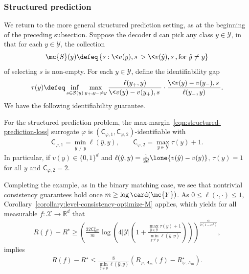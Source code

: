 \documentclass[11pt]{article}
\newcommand{\prn}[1]{\left({#1}\right)} %
\newcommand{\constant}{\mathsf{C}}  %
\newcommand{\cstMT}{\constant_{\mathsf{MT}}}
\newcommand{\pred}{\mathsf{d}}  %
\newcommand{\sX}{\mathcal{X}} %
\newcommand{\sY}{\mathcal{Y}} %
\newcommand{\tloss}{\ell}  %
\newcommand{\sloss}{\varphi}  %
\begin{document}
\subsubsection{Structured prediction}

We return to the more general structured prediction setting, as
at the beginning of the preceding subsection.
%
Suppose the
decoder $\pred$ can pick any class $y \in \sY$, in that for
each $y \in \sY$, the collection
\begin{align*}
  \mc{S}(y) \defeq
  \left\{s: \< v(y), s\> > \< v(\hat y), s \>, \mbox{for~} \hat{y} \neq y\right\}
\end{align*}
of selecting $s$
is non-empty.
%
For each $y \in \sY$, define the identifiability gap
\begin{align*}
  \tau(y) \defeq \inf_{s \in \mathcal{S}(y)}
  \max_{y_+, y_- \neq y}
  \frac{\tloss(y_+,y)}{\<v(y) - v(y_+), s\>}
  \cdot \frac{\<v(y) - v(y_-), s\>}{
    \tloss(y_-, y)}.
\end{align*}
We have the following identifiability guarantee.
\begin{lemma}
  \label{lemma:structured-feasible}
  For the structured prediction problem,
  the max-margin~\eqref{eqn:structured-prediction-loss}
  surrogate $\sloss$ is $(\constant_{\sloss, 1}, \constant_{\sloss,
    2})$-identifiable with
  \begin{align*}
    \constant_{\sloss, 1} = \min_{\hat y \neq y} \tloss(\hat y,
    y), \qquad \constant_{\sloss, 2} = \max_{y \in \sY}\tau(y) + 1.
  \end{align*}
  In particular, if $v(y) \in \{0, 1\}^d$ and $\ell(\hat{y}, y) =
  \frac{1}{2d} \lone{v(\hat{y}) - v(y)}$, $\tau(y) = 1$ for all $y$
  and $\constant_{\sloss, 2} = 2$.
\end{lemma}

Completing the example, as in the binary matching case, we see
that nontrivial consistency guarantees hold once $m \ge \log \card(\mc{Y})$.
%
As $0 \leq \tloss(\cdot, \cdot) \leq 1$, 
Corollary~\ref{corollary:level-consistency-optimize-M} applies, which
yields for all measurable $f: \sX \to \mathbb{R}^d$ that
\begin{align*}
  R(f) - R^\star \geq \prn{\frac{32 \cstMT^4}{m} \log \prn{4|\sY|\left(1 + \frac{\max_{\hat y \in \sY}\tau(y) + 1}{\min_{\hat y \neq y} \tloss(\hat y, y)}\right)}}^{\frac{\alpha}{2(1-\alpha^2)}},
\end{align*}
implies
\begin{align*}
  R(f) - R^\star \leq \frac{8}{\min_{\hat y \neq y} \tloss(\hat y, y)}
  (R_{\sloss,A_m}(f) - R_{\sloss,A_m}^\star) .
\end{align*}
\end{document}
